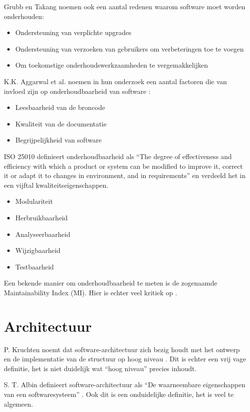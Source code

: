 Grubb en Takang noemen ook een aantal redenen waarom software moet worden onderhouden:
\begin{itemize}
	\item Ondersteuning van verplichte upgrades
	\item Ondersteuning van verzoeken van gebruikers om verbeteringen toe te voegen
	\item Om toekomstige onderhoudswerkzaamheden te vergemakkelijken
\end{itemize}

K.K. Aggarwal et al. noemen in hun onderzoek een aantal factoren die van invloed zijn op onderhoudbaarheid van software \parencite{MaintainabilityMeasure}:
\begin{itemize}
	\item Leesbaarheid van de broncode
	\item Kwaliteit van de documentatie
	\item Begrijpelijkheid van software
\end{itemize}

ISO 25010 \parencite{ISO25010} definieert onderhoudbaarheid als \enquote{The degree of effectiveness and efficiency with which a product or system can be modified to improve it, correct it or adapt it to changes in environment, and in requirements} en verdeeld het in een vijftal kwaliteitseigenschappen.
\begin{itemize}
	\item Modulariteit
	\item Herbruikbaarheid
	\item Analyseerbaarheid
	\item Wijzigbaarheid
	\item Testbaarheid
\end{itemize}

Een bekende manier om onderhoudbaarheid te meten is de zogenaamde Maintainability Index (MI). Hier is echter veel kritiek op \parencite{MaintainabilityLiteratureReview, WhyNoMI, WhyNoMI2}.

\section{Architectuur}
P. Kruchten noemt dat software-architectuur zich bezig houdt met het ontwerp en de implementatie van de structuur op hoog niveau \parencite{4plus1}. Dit is echter een vrij vage definitie, het is niet duidelijk wat \enquote{hoog niveau} precies inhoudt.

S. T. Albin definieert software-architectuur als \enquote{De waarneembare eigenschappen van een softwaresysteem} \parencite{ArtOfArchitecture}. Ook dit is een onduidelijke definitie, het is veel te algemeen.


